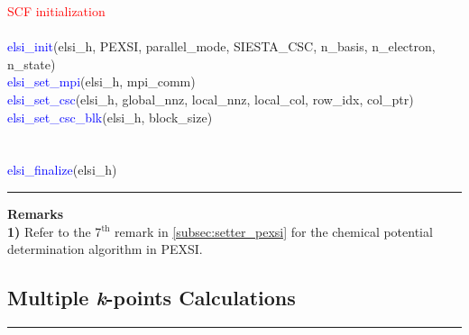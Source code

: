 \documentclass{report}
\begin{document}
\begin{algorithm}[H]
\textcolor{red}{SCF initialization}\\
\hspace{0.3cm}\\
\textcolor{blue}{elsi\_init}(elsi\_h, PEXSI, parallel\_mode, SIESTA\_CSC, n\_basis, n\_electron, n\_state)\\
\textcolor{blue}{elsi\_set\_mpi}(elsi\_h, mpi\_comm)\\
\textcolor{blue}{elsi\_set\_csc}(elsi\_h, global\_nnz, local\_nnz, local\_col, row\_idx, col\_ptr)\\
\textcolor{blue}{elsi\_set\_csc\_blk}(elsi\_h, block\_size)\\
\hspace{0.3cm}\\
\hspace{0.3cm}\\
\textcolor{blue}{elsi\_finalize}(elsi\_h)\\
\end{algorithm}

\bigskip
\noindent\rule{18cm}{0.4pt}

\bigskip
\textbf{Remarks}\\

\textbf{1)} Refer to the 7$^\text{th}$ remark in \ref{subsec:setter_pexsi} for the chemical potential determination algorithm in PEXSI.\\

\subsection{Multiple \textbf{\textit{k}}-points Calculations}
\label{subsec:example_kpt}
\noindent\rule{18cm}{0.4pt}
\bigskip
\end{document}
